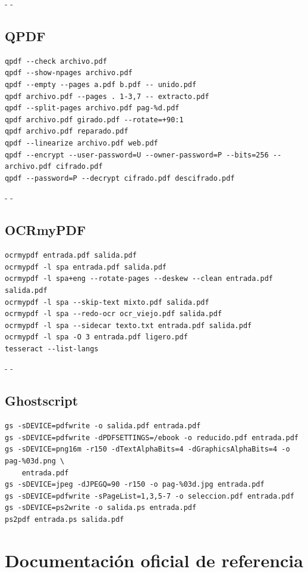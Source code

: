\documentclass[11pt,a4paper]{article}
\makeatletter
\newcommand{\necesitaespacio}[1]{\par\penalty-100\begingroup
	\setlength{\dimen@}{#1}\dimen@ii\pagegoal\advance\dimen@ii-\pagetotal
	\ifdim\dimen@>\dimen@ii\ifdim\dimen@ii>\z@\vfil\fi\penalty-\@M\fi\endgroup}
\makeatother
\begin{document}
	\necesitaespacio{8\baselineskip}
	\subsection*{QPDF}
	\begin{lstlisting}
qpdf --check archivo.pdf
qpdf --show-npages archivo.pdf
qpdf --empty --pages a.pdf b.pdf -- unido.pdf
qpdf archivo.pdf --pages . 1-3,7 -- extracto.pdf
qpdf --split-pages archivo.pdf pag-%d.pdf
qpdf archivo.pdf girado.pdf --rotate=+90:1
qpdf archivo.pdf reparado.pdf
qpdf --linearize archivo.pdf web.pdf
qpdf --encrypt --user-password=U --owner-password=P --bits=256 -- archivo.pdf cifrado.pdf
qpdf --password=P --decrypt cifrado.pdf descifrado.pdf
\end{lstlisting}
	
	\necesitaespacio{8\baselineskip}
	\subsection*{OCRmyPDF}
	\begin{lstlisting}
ocrmypdf entrada.pdf salida.pdf
ocrmypdf -l spa entrada.pdf salida.pdf
ocrmypdf -l spa+eng --rotate-pages --deskew --clean entrada.pdf salida.pdf
ocrmypdf -l spa --skip-text mixto.pdf salida.pdf
ocrmypdf -l spa --redo-ocr ocr_viejo.pdf salida.pdf
ocrmypdf -l spa --sidecar texto.txt entrada.pdf salida.pdf
ocrmypdf -l spa -O 3 entrada.pdf ligero.pdf
tesseract --list-langs
\end{lstlisting}
	
	\necesitaespacio{8\baselineskip}
	\subsection*{Ghostscript}
	\begin{lstlisting}
gs -sDEVICE=pdfwrite -o salida.pdf entrada.pdf
gs -sDEVICE=pdfwrite -dPDFSETTINGS=/ebook -o reducido.pdf entrada.pdf
gs -sDEVICE=png16m -r150 -dTextAlphaBits=4 -dGraphicsAlphaBits=4 -o pag-%03d.png \
    entrada.pdf
gs -sDEVICE=jpeg -dJPEGQ=90 -r150 -o pag-%03d.jpg entrada.pdf
gs -sDEVICE=pdfwrite -sPageList=1,3,5-7 -o seleccion.pdf entrada.pdf
gs -sDEVICE=ps2write -o salida.ps entrada.pdf
ps2pdf entrada.ps salida.pdf
\end{lstlisting}
	\endgroup
	
	\clearpage
	\section{Documentación oficial de referencia}\label{sec:fuentes}
	
\end{document}
